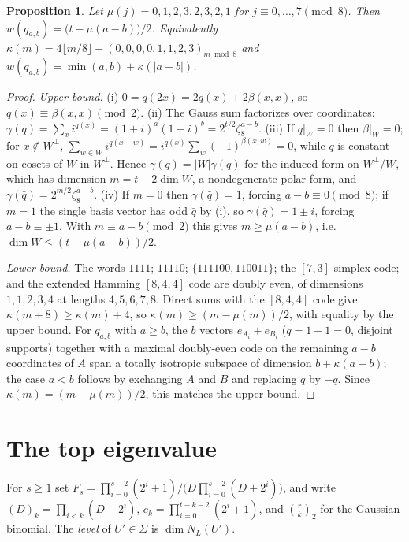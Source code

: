 \documentclass[11pt]{article}
\newtheorem{proposition}[theorem]{Proposition}
\theoremstyle{definition}
\theoremstyle{remark}
\begin{document}
\begin{proposition}\label{prop:witt}
Let $\mu(j)=0,1,2,3,2,3,2,1$ for $j\equiv0,\dots,7\pmod8$. Then $w(q_{a,b})=\big(t-\mu(a-b)\big)/2$. Equivalently
$\kappa(m)=4\lfloor m/8\rfloor+(0,0,0,0,1,1,2,3)_{m\bmod 8}$ and $w(q_{a,b})=\min(a,b)+\kappa(|a-b|)$.
\end{proposition}
\begin{proof}
\emph{Upper bound.} (i) $0=q(2x)=2q(x)+2\beta(x,x)$, so $q(x)\equiv\beta(x,x)\pmod2$. (ii) The Gauss sum factorizes
over coordinates: $\gamma(q)=\sum_xi^{q(x)}=(1+i)^a(1-i)^b=2^{t/2}\zeta_8^{a-b}$. (iii) If $q|_W=0$ then
$\beta|_W=0$; for $x\notin W^\perp$, $\sum_{w\in W}i^{q(x+w)}=i^{q(x)}\sum_w(-1)^{\beta(x,w)}=0$, while $q$ is constant
on cosets of $W$ in $W^\perp$. Hence $\gamma(q)=|W|\gamma(\bar q)$ for the induced form on $W^\perp/W$, which has
dimension $m=t-2\dim W$, a nondegenerate polar form, and $\gamma(\bar q)=2^{m/2}\zeta_8^{a-b}$. (iv) If $m=0$ then
$\gamma(\bar q)=1$, forcing $a-b\equiv0\pmod8$; if $m=1$ the single basis vector has odd $\bar q$ by (i), so
$\gamma(\bar q)=1\pm i$, forcing $a-b\equiv\pm1$. With $m\equiv a-b\pmod2$ this gives $m\ge\mu(a-b)$, i.e.
$\dim W\le(t-\mu(a-b))/2$.

\emph{Lower bound.} The words $1111$; $11110$; $\{111100,110011\}$; the $[7,3]$ simplex code; and the extended Hamming
$[8,4,4]$ code are doubly even, of dimensions $1,1,2,3,4$ at lengths $4,5,6,7,8$. Direct sums with the $[8,4,4]$ code
give $\kappa(m+8)\ge\kappa(m)+4$, so $\kappa(m)\ge(m-\mu(m))/2$, with equality by the upper bound. For $q_{a,b}$
with $a\ge b$, the $b$ vectors $e_{A_i}+e_{B_i}$ ($q=1-1=0$, disjoint supports) together with a maximal doubly-even
code on the remaining $a-b$ coordinates of $A$ span a totally isotropic subspace of dimension $b+\kappa(a-b)$; the
case $a<b$ follows by exchanging $A$ and $B$ and replacing $q$ by $-q$. Since $\kappa(m)=(m-\mu(m))/2$, this matches
the upper bound.
\end{proof}

\section{The top eigenvalue}\label{sec:main}
For $s\ge1$ set $F_s=\prod_{i=0}^{s-2}(2^i+1)\big/\big(D\prod_{i=0}^{s-2}(D+2^i)\big)$, and write
$(D)_k=\prod_{i<k}(D-2^i)$, $c_k=\prod_{i=0}^{t-k-2}(2^i+1)$, and $\binom{r}{k}_2$ for the Gaussian binomial. The
\emph{level} of $U'\in\Sigma$ is $\dim N_L(U')$.
\end{document}
